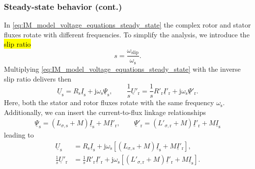 \begin{frame}
	\frametitle{Steady-state behavior (cont.)}
	In \eqref{eq:IM_model_voltage_equations_steady_state} the complex rotor and stator fluxes rotate with different frequencies. To simplify the analysis, we introduce the \hl{slip ratio}
	\begin{equation}
		s = \frac{\omega_\mathrm{slip}}{\omega_\mathrm{s}} .
	\end{equation}
	\pause
	Multiplying \eqref{eq:IM_model_voltage_equations_steady_state}  with the inverse slip ratio delivers then
	\begin{equation}
		\underline{U}_\mathrm{s} = R_\mathrm{s} \underline{I}_\mathrm{s} + \mathrm{j}\omega_\mathrm{s}\underline{\Psi}_\mathrm{s}, \qquad
		\frac{1}{s}\underline{U}'_\mathrm{r} = \frac{1}{s}R'_\mathrm{r} \underline{I}'_\mathrm{r} +\mathrm{j}\omega_\mathrm{s}\underline{\Psi}'_\mathrm{r}.
		\label{eq:IM_model_voltage_equations_steady_state_slip_ratio}
	\end{equation}
	Here, both the stator and rotor fluxes rotate with the same frequency $\omega_\mathrm{s}$. \pause  Additionally, we can insert the current-to-flux linkage relationships
	\begin{align}
		\underline{\Psi}_\mathrm{s} = (L_{\sigma,\mathrm{s}} +M) \underline{I}_\mathrm{s} +  M\underline{I}'_\mathrm{r}, \qquad
		\underline{\Psi}'_\mathrm{r} = (L'_{\sigma,\mathrm{r}} + M) \underline{I}'_\mathrm{r} +  M \underline{I}_\mathrm{s}
		\label{eq:IM_model_current_flux_linkage_equations_steady_state}
	\end{align}
	\pause leading to
	\begin{equation}
		\begin{alignedat}{2}
			\underline{U}_\mathrm{s}             & = R_\mathrm{s} \underline{I}_\mathrm{s} + \mathrm{j}\omega_\mathrm{s}\left[(L_{\sigma,\mathrm{s}} +M) \underline{I}_\mathrm{s} +  M\underline{I}'_\mathrm{r}\right],                \\
			\frac{1}{s}\underline{U}'_\mathrm{r} & = \frac{1}{s}R'_\mathrm{r} \underline{I}'_\mathrm{r} +\mathrm{j}\omega_\mathrm{s}\left[(L'_{\sigma,\mathrm{r}} + M) \underline{I}'_\mathrm{r} +  M \underline{I}_\mathrm{s}\right].
		\end{alignedat}
		\label{eq:IM_model_voltage_equations_steady_state_current_flux_linkage}
	\end{equation}
\end{frame}

